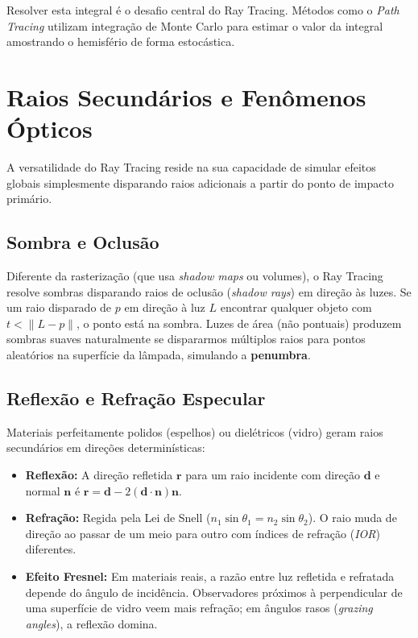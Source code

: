Resolver esta integral é o desafio central do Ray Tracing. Métodos como o \textit{Path Tracing} utilizam integração de Monte Carlo para estimar o valor da integral amostrando o hemisfério de forma estocástica.

\section{Raios Secundários e Fenômenos Ópticos}

A versatilidade do Ray Tracing reside na sua capacidade de simular efeitos globais simplesmente disparando raios adicionais a partir do ponto de impacto primário.

\subsection{Sombra e Oclusão}

Diferente da rasterização (que usa \textit{shadow maps} ou volumes), o Ray Tracing resolve sombras disparando raios de oclusão (\textit{shadow rays}) em direção às luzes. Se um raio disparado de $p$ em direção à luz $L$ encontrar qualquer objeto com $t < \|L-p\|$, o ponto está na sombra. Luzes de área (não pontuais) produzem sombras suaves naturalmente se dispararmos múltiplos raios para pontos aleatórios na superfície da lâmpada, simulando a \textbf{penumbra}.

\subsection{Reflexão e Refração Especular}

Materiais perfeitamente polidos (espelhos) ou dielétricos (vidro) geram raios secundários em direções determinísticas:
\begin{itemize}
    \item \textbf{Reflexão:} A direção refletida $\mathbf{r}$ para um raio incidente com direção $\mathbf{d}$ e normal $\mathbf{n}$ é $\mathbf{r} = \mathbf{d} - 2(\mathbf{d}\cdot\mathbf{n})\mathbf{n}$.
    \item \textbf{Refração:} Regida pela Lei de Snell ($n_1 \sin \theta_1 = n_2 \sin \theta_2$). O raio muda de direção ao passar de um meio para outro com índices de refração (\textit{IOR}) diferentes.
    \item \textbf{Efeito Fresnel:} Em materiais reais, a razão entre luz refletida e refratada depende do ângulo de incidência. Observadores próximos à perpendicular de uma superfície de vidro veem mais refração; em ângulos rasos (\textit{grazing angles}), a reflexão domina.
\end{itemize}

